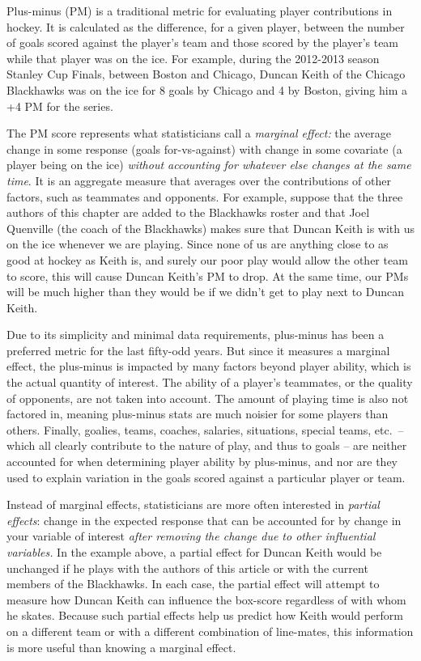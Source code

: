 Plus-minus (PM) is a traditional metric for evaluating player contributions in
hockey. It is calculated as the difference, for a given player, between the
number of goals scored against the player's team and those scored by the
player's team while that player was on the ice.  For example, during the
2012-2013 season Stanley Cup Finals, between Boston and Chicago, Duncan Keith
of the Chicago Blackhawks was on the ice for 8 goals by Chicago and 4 by
Boston, giving him a +4 PM for the series.

The PM score represents what statisticians call a \textit{marginal effect:}
the average change in some response (goals for-vs-against) with change in some
covariate (a player being on the ice) \textit{without accounting for whatever
else changes at the same time}. It is an aggregate measure that averages over
the contributions of other factors, such as teammates and opponents.   For
example, suppose that the three authors of this chapter are added to the
Blackhawks roster and that Joel Quenville (the coach of the Blackhawks) makes
sure that Duncan Keith is with us on the ice whenever we are playing.  Since
none of us are anything close to as good at hockey as Keith is, and surely our
poor play would allow the other team to score, this will cause Duncan Keith's
PM to drop.  At the same time, our PMs will be much higher than they would be
if we didn't get to play next to Duncan Keith.

Due to its simplicity and minimal data requirements, plus-minus has been a
preferred metric for the last fifty-odd years.  But since it measures a
marginal effect, the plus-minus is impacted by many factors beyond player
ability, which is the actual quantity of interest.  The ability of a player's
teammates, or the quality of opponents, are not taken into account.  The amount of
playing time is also not factored in, meaning plus-minus stats are much
noisier for some players than others. Finally, goalies, teams, coaches,
salaries, situations, special teams, etc.~-- which all clearly contribute to
the nature of play, and thus to goals -- are neither accounted for when
determining player ability by plus-minus, and nor are they used to explain
variation in the goals scored against a particular player or team.

Instead of marginal effects, statisticians are more often interested in
\textit{partial effects}: change in the expected response that can be
accounted for by change in your variable of interest \textit{after removing
the change due to other influential variables.} In the example above, a
partial effect for Duncan Keith would be unchanged if he plays with the
authors of this article or with the current members of the Blackhawks.  In
each case, the partial effect will attempt to measure how Duncan Keith can
influence the box-score regardless of with whom he skates. Because such partial
effects help us predict how Keith would perform on a different team or with a
different combination of line-mates, this information is more useful than
knowing a marginal effect.

